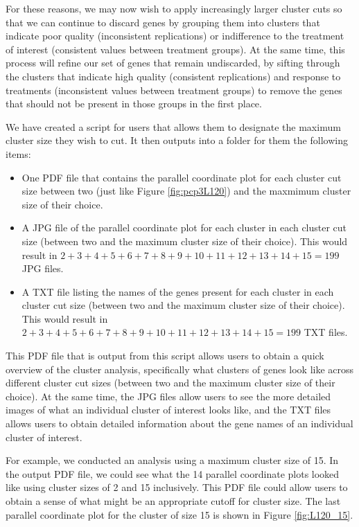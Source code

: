 \documentclass[11pt,a4paper,oldfontcommands,openany]{memoir}
\numberwithin{equation}{section} %
\begin{document}
For these reasons, we may now wish to apply increasingly larger cluster cuts so that we can continue to discard genes by grouping them into clusters that indicate poor quality (inconsistent replications) or indifference to the treatment of interest (consistent values between treatment groups). At the same time, this process will refine our set of genes that remain undiscarded, by sifting through the clusters that indicate high quality (consistent replications) and response to treatments (inconsistent values between treatment groups) to remove the genes that should not be present in those groups in the first place.

We have created a script for users that allows them to designate the maximum cluster size they wish to cut. It then outputs into a folder for them the following items:

\begin{itemize}

\item One PDF file that contains the parallel coordinate plot for each cluster cut size between two (just like Figure \ref{fig:pcp3L120}) and the maxmimum cluster size of their choice.

\item A JPG file of the parallel coordinate plot for each cluster in each cluster cut size (between two and the maximum cluster size of their choice). This would result in $2+3+4+5+6+7+8+9+10+11+12+13+14+15=199$ JPG files.

\item A TXT file listing the names of the genes present for each cluster in each cluster cut size (between two and the maximum cluster size of their choice). This would result in $2+3+4+5+6+7+8+9+10+11+12+13+14+15=199$ TXT files.

\end{itemize}

This PDF file that is output from this script allows users to obtain a quick overview of the cluster analysis, specifically what clusters of genes look like across different cluster cut sizes (between two and the maximum cluster size of their choice). At the same time, the JPG files allow users to see the more detailed images of what an individual cluster of interest looks like, and the TXT files allows users to obtain detailed information about the gene names of an individual cluster of interest.

For example, we conducted an analysis using a maximum cluster size of 15. In the output PDF file, we could see what the 14 parallel coordinate plots looked like using cluster sizes of 2 and 15 inclusively. This PDF file could allow users to obtain a sense of what might be an appropriate cutoff for cluster size. The last parallel coordinate plot for the cluster of size 15 is shown in Figure \ref{fig:L120_15}.
\end{document}
